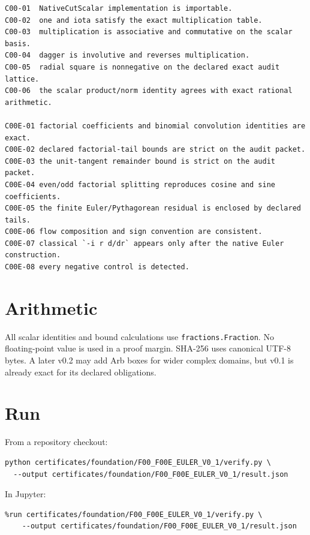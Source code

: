 \begin{verbatim}
C00-01  NativeCutScalar implementation is importable.
C00-02  one and iota satisfy the exact multiplication table.
C00-03  multiplication is associative and commutative on the scalar basis.
C00-04  dagger is involutive and reverses multiplication.
C00-05  radial square is nonnegative on the declared exact audit lattice.
C00-06  the scalar product/norm identity agrees with exact rational arithmetic.

C00E-01 factorial coefficients and binomial convolution identities are exact.
C00E-02 declared factorial-tail bounds are strict on the audit packet.
C00E-03 the unit-tangent remainder bound is strict on the audit packet.
C00E-04 even/odd factorial splitting reproduces cosine and sine coefficients.
C00E-05 the finite Euler/Pythagorean residual is enclosed by declared tails.
C00E-06 flow composition and sign convention are consistent.
C00E-07 classical `-i r d/dr` appears only after the native Euler construction.
C00E-08 every negative control is detected.
\end{verbatim}

\hypertarget{arithmetic}{%
\section{Arithmetic}\label{arithmetic}}

All scalar identities and bound calculations use \texttt{fractions.Fraction}. No
floating-point value is used in a proof margin. SHA-256 uses canonical UTF-8
bytes. A later v0.2 may add Arb boxes for wider complex domains, but v0.1 is
already exact for its declared obligations.

\hypertarget{run}{%
\section{Run}\label{run}}

From a repository checkout:

\begin{verbatim}
python certificates/foundation/F00_F00E_EULER_V0_1/verify.py \
  --output certificates/foundation/F00_F00E_EULER_V0_1/result.json
\end{verbatim}

In Jupyter:

\begin{verbatim}
%run certificates/foundation/F00_F00E_EULER_V0_1/verify.py \
    --output certificates/foundation/F00_F00E_EULER_V0_1/result.json
\end{verbatim}

